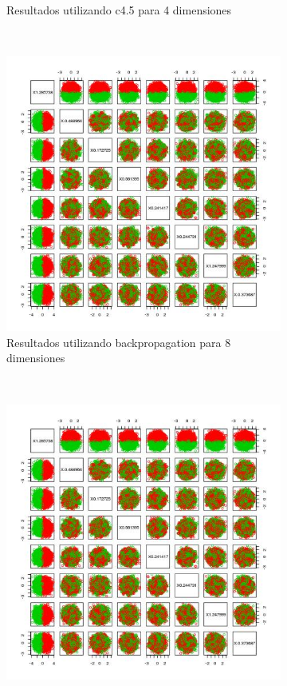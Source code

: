 \documentclass[12pt, a4paper]{article}
\begin{document}
\begin{figure}
\begin{subfigure}[b]{0.45\textwidth}
        \caption{Resultados utilizando c4.5 para 4 dimensiones}  
    \end{subfigure}


~ %
    \begin{subfigure}[b]{0.45\textwidth}
        \includegraphics[width=\textwidth]{prediccionB8}
        \caption{Resultados utilizando backpropagation para 8 dimensiones}  
    \end{subfigure}
      ~ %
    \begin{subfigure}[b]{0.45\textwidth}
        \includegraphics[width=\textwidth]{prediccionB8tree}

\end{subfigure}
\end{figure}
\end{document}
